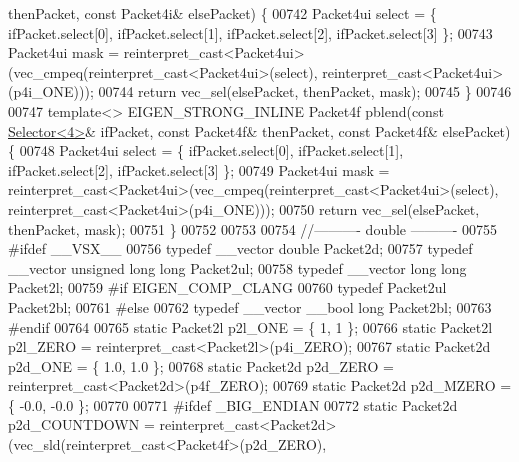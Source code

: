 \begin{DoxyCode}
{      thenPacket, \textcolor{keyword}{const} Packet4i& elsePacket) \{
00742   Packet4ui select = \{ ifPacket.select[0], ifPacket.select[1], ifPacket.select[2], ifPacket.select[3] \};
00743   Packet4ui mask = \textcolor{keyword}{reinterpret\_cast<}Packet4ui\textcolor{keyword}{>}(vec\_cmpeq(reinterpret\_cast<Packet4ui>(select), 
      reinterpret\_cast<Packet4ui>(p4i\_ONE)));
00744   \textcolor{keywordflow}{return} vec\_sel(elsePacket, thenPacket, mask);
00745 \}
00746 
00747 \textcolor{keyword}{template}<> EIGEN\_STRONG\_INLINE Packet4f pblend(\textcolor{keyword}{const} \hyperlink{struct_eigen_1_1internal_1_1_selector}{Selector<4>}& ifPacket, \textcolor{keyword}{const} Packet4f& 
      thenPacket, \textcolor{keyword}{const} Packet4f& elsePacket) \{
00748   Packet4ui select = \{ ifPacket.select[0], ifPacket.select[1], ifPacket.select[2], ifPacket.select[3] \};
00749   Packet4ui mask = \textcolor{keyword}{reinterpret\_cast<}Packet4ui\textcolor{keyword}{>}(vec\_cmpeq(reinterpret\_cast<Packet4ui>(select), 
      reinterpret\_cast<Packet4ui>(p4i\_ONE)));
00750   \textcolor{keywordflow}{return} vec\_sel(elsePacket, thenPacket, mask);
00751 \}
00752 
00753 
00754 \textcolor{comment}{//---------- double ----------}
00755 \textcolor{preprocessor}{#ifdef \_\_VSX\_\_}
00756 \textcolor{keyword}{typedef} \_\_vector \textcolor{keywordtype}{double}              Packet2d;
00757 \textcolor{keyword}{typedef} \_\_vector \textcolor{keywordtype}{unsigned} \textcolor{keywordtype}{long} \textcolor{keywordtype}{long}  Packet2ul;
00758 \textcolor{keyword}{typedef} \_\_vector \textcolor{keywordtype}{long} \textcolor{keywordtype}{long}           Packet2l;
00759 \textcolor{preprocessor}{#if EIGEN\_COMP\_CLANG}
00760 \textcolor{keyword}{typedef} Packet2ul                    Packet2bl;
00761 \textcolor{preprocessor}{#else}
00762 \textcolor{keyword}{typedef} \_\_vector \_\_bool \textcolor{keywordtype}{long}         Packet2bl;
00763 \textcolor{preprocessor}{#endif}
00764 
00765 \textcolor{keyword}{static} Packet2l  p2l\_ONE  = \{ 1, 1 \};
00766 \textcolor{keyword}{static} Packet2l  p2l\_ZERO = \textcolor{keyword}{reinterpret\_cast<}Packet2l\textcolor{keyword}{>}(p4i\_ZERO);
00767 \textcolor{keyword}{static} Packet2d  p2d\_ONE  = \{ 1.0, 1.0 \}; 
00768 \textcolor{keyword}{static} Packet2d  p2d\_ZERO = \textcolor{keyword}{reinterpret\_cast<}Packet2d\textcolor{keyword}{>}(p4f\_ZERO);
00769 \textcolor{keyword}{static} Packet2d  p2d\_MZERO = \{ -0.0, -0.0 \};
00770 
00771 \textcolor{preprocessor}{#ifdef \_BIG\_ENDIAN}
00772 \textcolor{keyword}{static} Packet2d p2d\_COUNTDOWN = \textcolor{keyword}{reinterpret\_cast<}Packet2d\textcolor{keyword}{>}(vec\_sld(reinterpret\_cast<Packet4f>(p2d\_ZERO), 
}
\end{DoxyCode}
